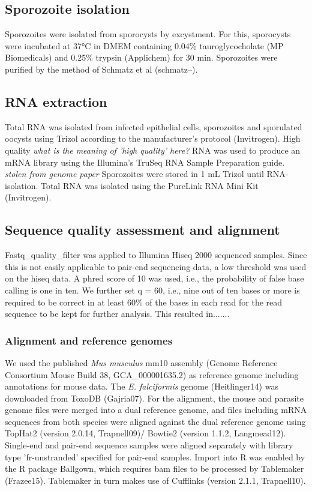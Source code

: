 \documentclass{article}
\begin{document}
\subsection{Sporozoite isolation}
Sporozoites were isolated from sporocysts by excystment. For this, sporocysts were incubated at 
37$°$C in DMEM containing 0.04\% tauroglycocholate (MP Biomedicals) and 0.25\% trypsin (Applichem) 
for 30 min. Sporozoites were purified by the method of Schmatz et al (schmatz--).

\subsection{RNA extraction}
Total RNA was isolated from infected epithelial cells, sporozoites and sporulated oocysts 
using Trizol according to the manufacturer’s protocol (Invitrogen). High quality  \emph{what is the meaning of 'high quality' here?}
RNA was used to produce an mRNA library using the Illumina’s TruSeq RNA Sample Preparation guide.
\emph{stolen from genome paper}
Sporozoites were stored in 1 mL Trizol until RNA-isolation. 
Total RNA was isolated using the PureLink RNA Mini Kit (Invitrogen).

\subsection{Sequence quality assessment and alignment}
Fastq\_quality\_filter was applied to Illumina Hiseq 2000 sequenced samples. 
Since this is not easily applicable to pair-end sequencing data, a low threshold was 
used on the hiseq data. A phred score of 10 was used, i.e., the probability of false base 
calling is one in ten. We further set q = 60, i.e., nine out of ten bases
or more is required to be correct in at least 
60\% of the bases in each read for the read sequence to be kept for further analysis.
This resulted in.......

\subsubsection{Alignment and reference genomes}
We used the published \textit{Mus musculus} mm10 assembly (Genome Reference Consortium Mouse 
Build 38, GCA\_000001635.2) as reference genome including annotations for mouse data. The
\textit{E. falciformis} genome (Heitlinger14) was downloaded from ToxoDB (Gajria07). For the
alignment, the mouse and parasite genome files were merged into a dual reference genome, and 
files including mRNA sequences from both species were aligned against the dual reference genome
using TopHat2 (version 2.0.14, Trapnell09)/ Bowtie2 (version 1.1.2, Langmead12). Single-end and 
pair-end sequence samples were aligned separately with library type 'fr-unstranded' specified 
for pair-end samples. Import into R was enabled by the R package Ballgown, which requires bam 
files to be processed by Tablemaker (Frazee15). Tablemaker in turn makes use of Cufflinks 
(version 2.1.1, Trapnell10).
\end{document}
